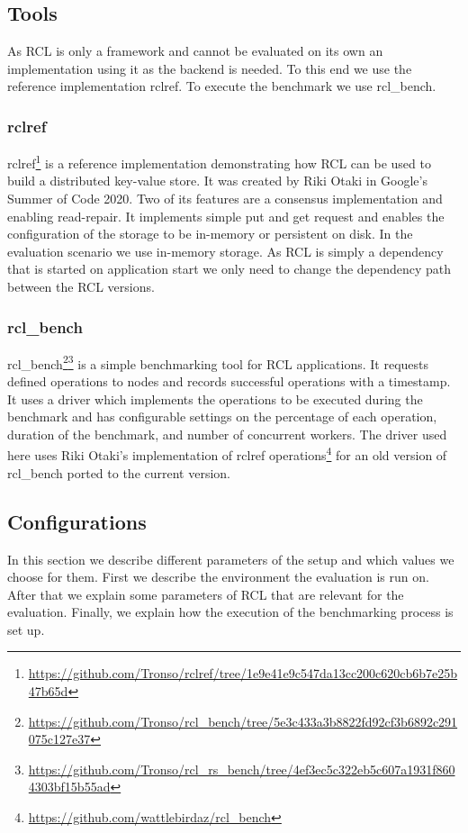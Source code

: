 \subsection{Tools}
As \ac{RCL} is only a framework and cannot be evaluated on its own an implementation using it as the backend is needed.
To this end we use the reference implementation rclref.
To execute the benchmark we use rcl\_bench.

\subsubsection{rclref}
rclref\footnote{\url{https://github.com/Tronso/rclref/tree/1e9e41e9c547da13cc200c620cb6b7e25b47b65d}} is a reference implementation demonstrating how \ac{RCL} can be used to build a distributed key-value store.
It was created by Riki Otaki in Google's Summer of Code 2020.
Two of its features are a consensus implementation and enabling read-repair.
It implements simple put and get request and enables the configuration of the storage to be in-memory or persistent on disk.
In the evaluation scenario we use in-memory storage.
As \ac{RCL} is simply a dependency that is started on application start we only need to change the dependency path between the \ac{RCL} versions.

\subsubsection{rcl\_bench}
rcl\_bench\footnote{\url{https://github.com/Tronso/rcl_bench/tree/5e3c433a3b8822fd92cf3b6892c291075c127e37}}\footnote{\url{https://github.com/Tronso/rcl_rs_bench/tree/4ef3ec5c322eb5c607a1931f8604303bf15b55ad}} is a simple benchmarking tool for \ac{RCL} applications.
It requests defined operations to nodes and records successful operations with a timestamp.
It uses a driver which implements the operations to be executed during the benchmark and has configurable settings on the percentage of each operation, duration of the benchmark, and number of concurrent workers.
The driver used here uses Riki Otaki's implementation of rclref operations\footnote{\url{https://github.com/wattlebirdaz/rcl_bench}} for an old version of rcl\_bench ported to the current version.

\subsection{Configurations}
In this section we describe different parameters of the setup and which values we choose for them.
First we describe the environment the evaluation is run on.
After that we explain some parameters of \ac{RCL} that are relevant for the evaluation.
Finally, we explain how the execution of the benchmarking process is set up.

